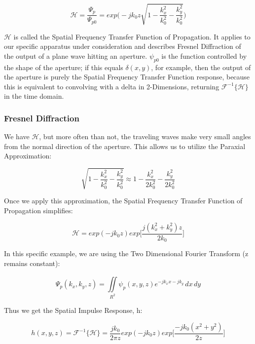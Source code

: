\documentclass[12pt]{article}
\begin{document}
\begin{equation}
	\mathscr{H} = \frac{\Psi_{p}}{\Psi_{p0}} = exp\Bigg(-jk_{0}z\sqrt{1 - \frac{k_{x}^2}{k_{0}^2} - \frac{k_{y}^2}{k_{0}^2}}\Bigg)
\end{equation}

\(\mathscr{H}\) is called the Spatial Frequency Transfer Function of Propagation. It applies to our specific apparatus under consideration and describes Fresnel Diffraction of the output of a plane wave hitting an aperture. \(\psi_{p0}\) is the function controlled by the shape of the aperture; if this equals \(\delta(x,y)\), for example, then the output of the aperture is purely the Spatial Frequency Transfer Function response, because this is equivalent to convolving with a delta in 2-Dimensions, returning \(\mathscr{F}^{-1} \{\mathscr{H}\} \) in the time domain.

\subsubsection{Fresnel Diffraction}

We have \(\mathscr{H}\), but more often than not, the traveling waves make very small angles from the normal direction of the aperture. This allows us to utilize the Paraxial Approximation:

\begin{equation}
	\sqrt{1 - \frac{k_{x}^2}{k_{0}^2} - \frac{k_{y}^2}{k_0^2}} \approx 1 - \frac{k_{x}^2}{2k_{0}^2} - \frac{k_{y}^2}{2k_{0}^2}
\end{equation}

Once we apply this approximation, the Spatial Frequency Transfer Function of Propagation simplifies:

\begin{equation}
	\mathscr{H} = exp(-jk_{0}z)exp\bigg[\frac{j(k_{x}^2 + k_{y}^2)z}{2k_{0}}\bigg]
\end{equation}

In this specific example, we are using the Two Dimensional Fourier Transform (z remains constant):

\begin{equation}
	\Psi_{p}(k_{x},k_{y},z) = \iint \limits_{R^2}^{} \psi_{p}(x,y,z)e^{-jk_{x}x - jk_{y}} \,dx\,dy
\end{equation}

Thus we get the Spatial Impulse Response, h:

\begin{equation}
	h(x,y,z) = \mathscr{F}^{-1}\{\mathscr{H}\} = \frac{jk_{0}}{2\pi z} exp(-jk_{0}z)exp\bigg[\frac{-jk_{0}(x^2 + y^2)}{2z}\bigg]
\end{equation}
\end{document}
